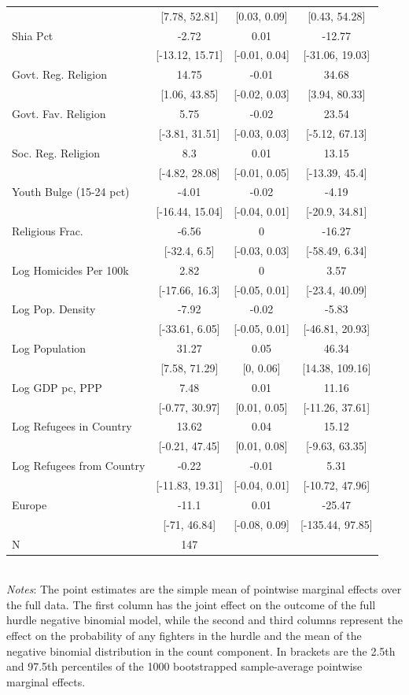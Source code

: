 \documentclass[12pt]{article}
\begin{document}
\begin{table}[!p]
\begin{tabular}{l ccc}
& [7.78, 52.81] & [0.03, 0.09] & [0.43, 54.28] \\ 
Shia Pct & -2.72 & 0.01 & -12.77 \\ 
& [-13.12, 15.71] & [-0.01, 0.04] & [-31.06, 19.03] \\ 
Govt. Reg. Religion & 14.75 & -0.01 & 34.68 \\ 
& [1.06, 43.85] & [-0.02, 0.03] & [3.94, 80.33] \\ 
Govt. Fav. Religion & 5.75 & -0.02 & 23.54 \\ 
& [-3.81, 31.51] & [-0.03, 0.03] & [-5.12, 67.13] \\ 
Soc. Reg. Religion & 8.3 & 0.01 & 13.15 \\ 
& [-4.82, 28.08] & [-0.01, 0.05] & [-13.39, 45.4] \\ 
Youth Bulge (15-24 pct) & -4.01 & -0.02 & -4.19 \\ 
& [-16.44, 15.04] & [-0.04, 0.01] & [-20.9, 34.81] \\ 
Religious Frac. & -6.56 & 0 & -16.27 \\ 
& [-32.4, 6.5] & [-0.03, 0.03] & [-58.49, 6.34] \\ 
Log Homicides Per 100k & 2.82 & 0 & 3.57 \\ 
& [-17.66, 16.3] & [-0.05, 0.01] & [-23.4, 40.09] \\ 
Log Pop. Density & -7.92 & -0.02 & -5.83 \\ 
& [-33.61, 6.05] & [-0.05, 0.01] & [-46.81, 20.93] \\ 
Log Population & 31.27 & 0.05 & 46.34 \\ 
& [7.58, 71.29] & [0, 0.06] & [14.38, 109.16] \\ 
Log GDP pc, PPP & 7.48 & 0.01 & 11.16 \\ 
& [-0.77, 30.97] & [0.01, 0.05] & [-11.26, 37.61] \\ 
Log Refugees in Country & 13.62 & 0.04 & 15.12 \\ 
& [-0.21, 47.45] & [0.01, 0.08] & [-9.63, 63.35] \\ 
Log Refugees from Country & -0.22 & -0.01 & 5.31 \\ 
& [-11.83, 19.31] & [-0.04, 0.01] & [-10.72, 47.96] \\ 
Europe & -11.1 & 0.01 & -25.47 \\ 
& [-71, 46.84] & [-0.08, 0.09] & [-135.44, 97.85] \\ 
\midrule
N & 147 & & \\
		\bottomrule
	\end{tabular}
	\\ \footnotesize \textit{Notes}: The point estimates are the simple mean of pointwise marginal effects over the full data. The first column has the joint effect on the outcome of the full hurdle negative binomial model, while the second and third columns represent the effect on the probability of any fighters in the hurdle and the mean of the negative binomial distribution in the count component. In brackets are the 2.5th and 97.5th percentiles of the 1000 bootstrapped sample-average pointwise marginal effects. 
\end{table}
\end{document}
